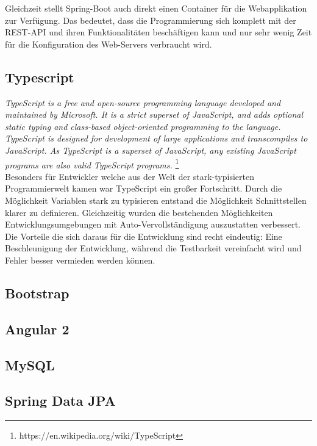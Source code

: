 Gleichzeit stellt Spring-Boot auch direkt einen Container für die Webapplikation zur Verfügung. Das bedeutet, dass die Programmierung sich komplett mit der REST-API und ihren Funktionalitäten beschäftigen kann und nur sehr wenig Zeit für die Konfiguration des Web-Servers verbraucht wird.


\subsection{Typescript}

\emph{\glqq   
TypeScript is a free and open-source programming language developed and maintained by Microsoft. It is a strict superset of JavaScript, and adds optional static typing and class-based object-oriented programming to the language. \\
TypeScript is designed for development of large applications and transcompiles to JavaScript. As TypeScript is a superset of JavaScript, any existing JavaScript programs are also valid TypeScript programs.
\grqq} \footnote{https://en.wikipedia.org/wiki/TypeScript} \\

Besonders für Entwickler welche aus der Welt der stark-typisierten Programmierwelt kamen war TypeScript ein großer Fortschritt. Durch die Möglichkeit Variablen stark zu typisieren entstand die Möglichkeit Schnittstellen klarer zu definieren. Gleichzeitig wurden die bestehenden Möglichkeiten Entwicklungsumgebungen mit Auto-Vervollständigung auszustatten verbessert. \\
Die Vorteile die sich daraus für die Entwicklung sind recht eindeutig: Eine Beschleunigung der Entwicklung, während die Testbarkeit vereinfacht wird und Fehler besser vermieden werden können.


\subsection{Bootstrap}

\subsection{Angular 2}

\subsection{MySQL}

\subsection{Spring Data JPA}




